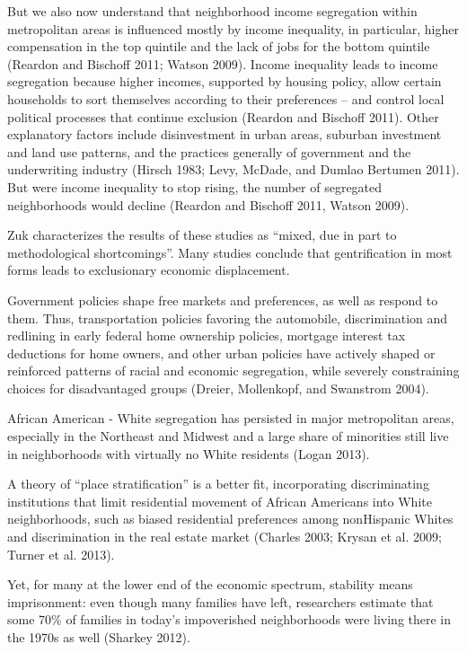 \documentclass[]{article}
\begin{document}
But we also now understand that neighborhood income segregation within
metropolitan areas is influenced mostly by income inequality, in
particular, higher compensation in the top quintile and the lack of jobs
for the bottom quintile (Reardon and Bischoff 2011; Watson 2009). Income
inequality leads to income segregation because higher incomes, supported
by housing policy, allow certain households to sort themselves according
to their preferences -- and control local political processes that
continue exclusion (Reardon and Bischoff 2011). Other explanatory
factors include disinvestment in urban areas, suburban investment and
land use patterns, and the practices generally of government and the
underwriting industry (Hirsch 1983; Levy, McDade, and Dumlao Bertumen
2011). But were income inequality to stop rising, the number of
segregated neighborhoods would decline (Reardon and Bischoff 2011,
Watson 2009).

Zuk characterizes the results of these studies as ``mixed, due in part
to methodological shortcomings''. Many studies conclude that
gentrification in most forms leads to exclusionary economic
displacement.

Government policies shape free markets and preferences, as well as
respond to them. Thus, transportation policies favoring the automobile,
discrimination and redlining in early federal home ownership policies,
mortgage interest tax deductions for home owners, and other urban
policies have actively shaped or reinforced patterns of racial and
economic segregation, while severely constraining choices for
disadvantaged groups (Dreier, Mollenkopf, and Swanstrom 2004).

African American - White segregation has persisted in major metropolitan
areas, especially in the Northeast and Midwest and a large share of
minorities still live in neighborhoods with virtually no White residents
(Logan 2013).

A theory of ``place stratification'' is a better fit, incorporating
discriminating institutions that limit residential movement of African
Americans into White neighborhoods, such as biased residential
preferences among nonHispanic Whites and discrimination in the real
estate market (Charles 2003; Krysan et al. 2009; Turner et al. 2013).

Yet, for many at the lower end of the economic spectrum, stability means
imprisonment: even though many families have left, researchers estimate
that some 70\% of families in today's impoverished neighborhoods were
living there in the 1970s as well (Sharkey 2012).
\end{document}
